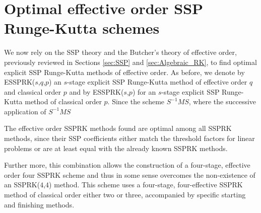 \section{Optimal effective order SSP Runge-Kutta schemes}\label{sec:Optimal_ESSPRK}

\indent We now rely on the SSP theory and the Butcher's theory of effective order, previously reviewed in Sections \ref{sec:SSP} and \ref{sec:Algebraic_RK}, to find optimal explicit SSP Runge-Kutta methods of effective order. As before, we denote by ESSPRK($s$,$q$,$p$) an $s$-stage explicit SSP Runge-Kutta method of effective order $q$ and classical order $p$ and by ESSPRK($s$,$p$) for an $s$-stage explicit SSP Runge-Kutta method of classical order $p$. Since the scheme $S^{-1}MS$, where  the successive application of $S^{-1}MS$








The effective order SSPRK methods found are optimal among all SSPRK methods, since their SSP coefficients either match the threshold factors for linear problems  or are at least equal with the already known SSPRK methods. 


Further more, this combination allows the construction of a
four-stage, effective order four SSPRK scheme and thus in some sense overcomes the
non-existence of an SSPRK(\( 4 \),\( 4 \)) method.  This scheme uses a
four-stage, four-effective SSPRK method of classical order either two
or three, accompanied by specific starting and finishing methods.


